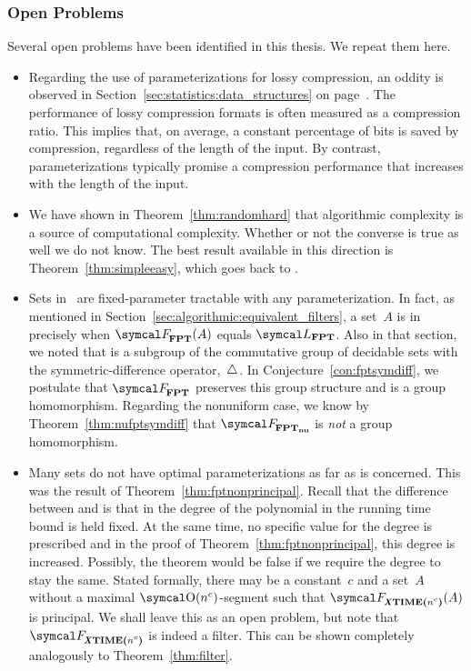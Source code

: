 \subsubsection{Open Problems}
Several open problems have been identified in this thesis.
We repeat them here.
\begin{itemize}
\item
  Regarding the use of parameterizations for lossy compression, an oddity is observed in Section~\ref{sec:statistics:data_structures} on page~\pageref{p:compression_ratio}.
  The performance of lossy compression formats is often measured as a compression ratio.
  This implies that, on average, a constant percentage of bits is saved by compression, regardless of the length of the input.
  By contrast, parameterizations typically promise a compression performance that increases with the length of the input.
\item
  We have shown in Theorem~\ref{thm:randomhard} that algorithmic complexity is a source of computational complexity.
  Whether or not the converse is true as well we do not know.
  The best result available in this direction is Theorem~\ref{thm:simpleeasy}, which goes back to \textcite[Theorem~14]{hartmanis1983generalized}.
\item
  Sets in~ are fixed-parameter tractable with any parameterization.
  In fact, as mentioned in Section~\ref{sec:algorithmic:equivalent_filters}, a set~$A$ is in~ precisely when $\calF_\cl{FPT}(A)$ equals $\calL_\cl{FPT}$.
  Also in that section, we noted that  is a subgroup of the commutative group of decidable sets with the symmetric-difference operator,~$\bigtriangleup$.
  In Conjecture~\ref{con:fptsymdiff}, we postulate that $\calF_\cl{FPT}$ preserves this group structure and is a group homomorphism.
  Regarding the nonuniform case, we know by Theorem~\ref{thm:nufptsymdiff} that $\calF_\clnu{FPT}$ is \emph{not} a group homomorphism.
\item
  Many sets do not have optimal parameterizations as far as  is concerned.
  This was the result of Theorem~\ref{thm:fptnonprincipal}.
  Recall that the difference between  and  is that in  the degree of the polynomial in the running time bound is held fixed.
  At the same time, no specific value for the degree is prescribed and in the proof of Theorem~\ref{thm:fptnonprincipal}, this degree is increased.
  Possibly, the theorem would be false if we require the degree to stay the same.
  Stated formally, there may be a constant~$c$ and a set~$A$ without a maximal $\bigO(n^c)$-segment such that $\calF_{\clX{\cltime{$n^c$}}}(A)$ is principal.
  We shall leave this as an open problem, but note that $\calF_\clX{\cltime{$n^c$}}$ is indeed a filter.
  This can be shown completely analogously to Theorem~\ref{thm:filter}.
\end{itemize}
